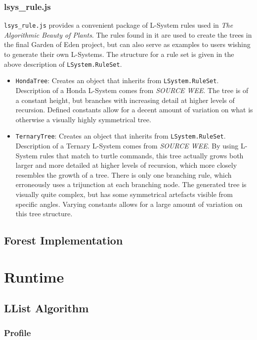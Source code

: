 \documentclass{article}
\newcommand{\tab}{\hspace*{2em}}
\begin{document}
            \subsubsection{lsys\_rule.js}
    \tab \verb|lsys_rule.js| provides a convenient package of L-System rules used in \emph{The
Algorithmic Beauty of Plants}. The rules found in it are used to create the trees in the final
Garden of Eden project, but can also serve as examples to users wishing to generate their own
L-Systems. The structure for a rule set is given in the above description of
\verb|LSystem.RuleSet|.
    \begin{itemize}
        \item \verb|HondaTree|: Creates an object that inherits from \verb|LSystem.RuleSet|.
Description of a Honda L-System comes from \emph{SOURCE WEE}. The tree is of a constant height, but
branches with increasing detail at higher levels of recursion. Defined constants allow for a
decent amount of variation on what is otherwise a visually highly symmetrical tree.

        \item \verb|TernaryTree|: Creates an object that inherits from \verb|LSystem.RuleSet|.
Description of a Ternary L-System comes from \emph{SOURCE WEE}. By using L-System rules that match
to turtle commands, this tree actually grows both larger and more detailed at higher levels of
recursion, which more closely resembles the growth of a tree. There is only one branching rule,
which erroneously uses a trijunction at each branching node. The generated tree is visually quite
complex, but has some symmetrical artefacts visible from specific angles. Varying constants allows
for a large amount of variation on this tree structure.

    \end{itemize}

    \subsection{Forest Implementation}

    \section{Runtime} %
        \subsection{LList Algorithm}
            \subsubsection{Profile}
\end{document}
